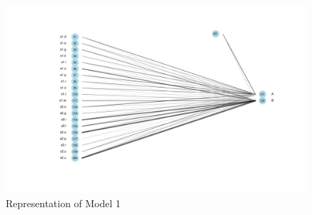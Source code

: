\begin{figure}
  \includegraphics[scale=0.45]{./figures/fake/model1.pdf}
  \caption{Representation of Model 1}\label{fig:model1}
\end{figure}

